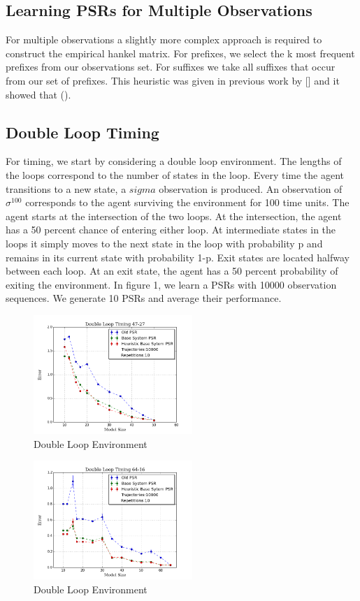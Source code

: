 \subsection{Learning PSRs for Multiple Observations}

For multiple observations a slightly more complex approach is required to construct the empirical hankel matrix. For prefixes, we select the k most frequent prefixes from our observations set. For suffixes we take all suffixes that occur from our set of prefixes. This heuristic was given in previous work by [] and it showed that ().

\subsection{Double Loop Timing}

For timing, we start by considering a double loop environment. The lengths of the loops correspond to the number of states in the loop. Every time the agent transitions to a new state, a $sigma$ observation is produced.  An observation of $\sigma^{100}$ corresponds to the agent surviving the environment for 100 time units. The agent starts at the intersection of the two loops. At the intersection, the agent has a 50 percent chance of entering either loop. At intermediate states in the loops it simply moves to the next state in the loop with probability p and remains in its current state with probability 1-p. Exit states are located halfway between each loop. At an exit state, the agent has a 50 percent probability of exiting the environment. In figure 1, we learn a PSRs with 10000 observation sequences. We generate 10 PSRs and average their performance. 

\begin{figure}[ht!]
\centering
\includegraphics[width=60mm]{uCOREPICS/DoubleLoopTimingHeuristics47-27.png}
\caption{Double Loop Environment\label{overflow}}
\end{figure}

\begin{figure}[ht!]
\centering
\includegraphics[width=60mm]{uCOREPICS/DoubleLoop64-16Heuristics.png}
\caption{Double Loop Environment\label{overflow}}
\end{figure}

